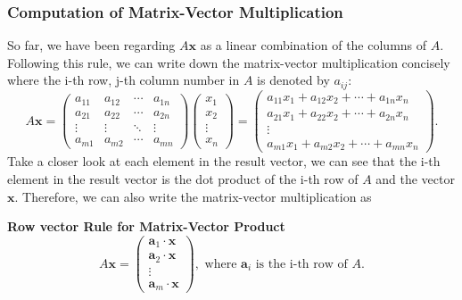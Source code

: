 \documentclass[10pt, a4paper]{article}
\begin{document}
\subsubsection*{Computation of Matrix-Vector Multiplication}
\indent So far, we have been regarding $A\mathbf{x}$ as a linear combination of the columns of $A$. Following this rule, we can write down the matrix-vector multiplication concisely where the i-th row, j-th column number in $A$ is denoted by $a_{ij}$:
\begin{equation*}
    A\mathbf{x} = \begin{pmatrix}
        a_{11} & a_{12} & \cdots & a_{1n} \\
        a_{21} & a_{22} & \cdots & a_{2n} \\
        \vdots & \vdots & \ddots & \vdots \\
        a_{m1} & a_{m2} & \cdots & a_{mn}
    \end{pmatrix} \begin{pmatrix}
        x_1 \\ x_2 \\ \vdots \\ x_n
    \end{pmatrix} = \begin{pmatrix}
        a_{11}x_1+a_{12}x_2+\cdots+a_{1n}x_n \\
        a_{21}x_1+a_{22}x_2+\cdots+a_{2n}x_n \\
        \vdots \\
        a_{m1}x_1+a_{m2}x_2+\cdots+a_{mn}x_n
    \end{pmatrix}.
\end{equation*}
Take a closer look at each element in the result vector, we can see that the i-th element in the result vector is the dot product of the i-th row of $A$ and the vector $\mathbf{x}$. Therefore, we can also write the matrix-vector multiplication as
\begin{proposition}
    \textbf{Row vector Rule for Matrix-Vector Product}\\
    \begin{equation*}
        A\mathbf{x} = \begin{pmatrix}
            \mathbf{a}_1\cdot \mathbf{x} \\
            \mathbf{a}_2\cdot \mathbf{x} \\
            \vdots \\
            \mathbf{a}_m\cdot \mathbf{x}
        \end{pmatrix}, \text{ where } \mathbf{a}_i \text{ is the i-th row of } A.
    \end{equation*}
\end{proposition}
\end{document}
